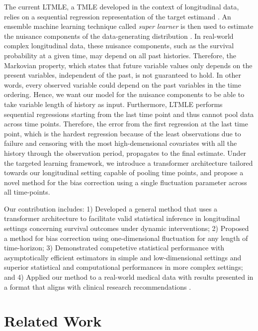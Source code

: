 \documentclass{article}
\theoremstyle{plain}
\theoremstyle{definition}
\theoremstyle{remark}
\begin{document}
The current LTMLE, a TMLE developed in the context of longitudinal data, relies on a sequential regression representation of the target estimand \cite{bangDoublyRobustEstimation2005}. An ensemble machine learning technique called \textit{super learner} is then used to estimate the nuisance components of the data-generating distribution \cite{superlearner}. In real-world complex longitudinal data, these nuisance components, such as the survival probability at a given time, may depend on all past histories. Therefore, the Markovian property, which states that future variable values only depends on the present variables, independent of the past, is not guaranteed to hold. In other words, every observed variable could depend on the past variables in the time ordering. Hence, we want our model for the nuisance components to be able to take variable length of history as input. Furthermore, LTMLE performs sequential regressions starting from the last time point and thus cannot pool data across time points. Therefore, the error from the first regression at the last time point, which is the hardest regression because of the least observations due to failure and censoring with the most high-demensional covariates with all the history through the observation period, propagates to the final estimate. Under the targeted learning framework, we introduce a transformer architecture tailored towards our longitudinal setting capable of pooling time points, and propose a novel method for the bias correction using a single fluctuation parameter across all time-points.

Our contribution includes:
1) Developed a general method that uses a transformer architecture to facilitate valid statistical inference in longitudinal settings concerning survival outcomes under dynamic interventions;
2) Proposed a method for bias correction using one-dimensional fluctuation for any length of time-horizon;
3) Demonstrated competetive statistical performance with asymptotically efficient estimators in simple and low-dimensional settings and superior statistical and computational performances in more complex settings;
and 4) Applied our method to a real-world medical data with results presented in a format that aligns with clinical research recommendations \citep{hernan_target_2022, dahabreh_causal_2024}.

\section{Related Work}
\end{document}
